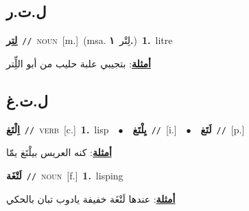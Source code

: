 \documentclass[10pt,a4paper,twoside]{article} %
\begin{document}
\begin{multicols}{2}
{{{{{{{{{{{{{{{\vspace{-3mm}
\subsection*{\color{blue}\foreignlanguage{arabic}{ل.ت.ر}\color{blue}{}} 

{\setlength\topsep{0pt}\textbf{\foreignlanguage{arabic}{لِتِر}}\ {\color{gray}\texttt{//}\color{black}}\ \textsc{noun}\ [m.]\ \color{gray}(msa. \foreignlanguage{arabic}{لِتْر}~\foreignlanguage{arabic}{\textbf{١.}})\color{black}\ \textbf{1.}~litre\  \begin{flushright}\color{gray}\foreignlanguage{arabic}{\textbf{\underline{\foreignlanguage{arabic}{أمثلة}}}: بتجيبي علبة حليب من أبو اللِِّتر}\end{flushright}\color{black}} \vspace{2mm}

\vspace{-3mm}
\subsection*{\color{blue}\foreignlanguage{arabic}{ل.ت.غ}\color{blue}{}} 

{\setlength\topsep{0pt}\textbf{\foreignlanguage{arabic}{اِلْتَغ}}\ {\color{gray}\texttt{//}\color{black}}\ \textsc{verb}\ [c.]\ \textbf{1.}~lisp\ \ $\bullet$\ \ \setlength\topsep{0pt}\textbf{\foreignlanguage{arabic}{يِلْتَغ}}\ {\color{gray}\texttt{//}\color{black}}\ [i.]\ \ $\bullet$\ \ \setlength\topsep{0pt}\textbf{\foreignlanguage{arabic}{لَتَغ}}\ {\color{gray}\texttt{//}\color{black}}\ [p.]\  \begin{flushright}\color{gray}\foreignlanguage{arabic}{\textbf{\underline{\foreignlanguage{arabic}{أمثلة}}}: كنه العريس بيلْتَغ يمّا}\end{flushright}\color{black}} \vspace{2mm}

{\setlength\topsep{0pt}\textbf{\foreignlanguage{arabic}{لَتْغَة}}\ {\color{gray}\texttt{//}\color{black}}\ \textsc{noun}\ [f.]\ \textbf{1.}~lisping\  \begin{flushright}\color{gray}\foreignlanguage{arabic}{\textbf{\underline{\foreignlanguage{arabic}{أمثلة}}}: عندها لَتْغَة خفيفة يادوب تبان بالحكي}\end{flushright}\color{black}} \vspace{2mm}

}}}}}}}}}}}}}}}
\end{multicols}
\end{document}
